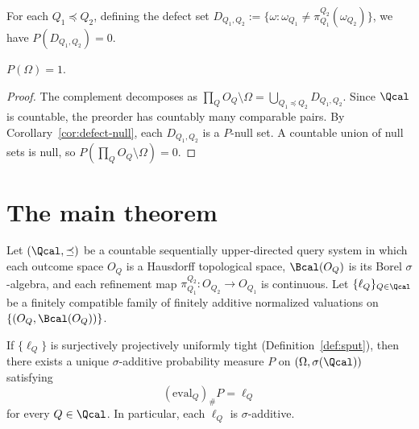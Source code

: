 \begin{corollary}
\label{cor:defect-null}
For each $Q_1 \preceq Q_2$, defining the defect set
$D_{Q_1,Q_2} := \{\omega : \omega_{Q_1} \neq
\pi^{Q_2}_{Q_1}(\omega_{Q_2})\}$, we have $P(D_{Q_1,Q_2}) = 0$.
\end{corollary}

\begin{theorem}
\label{thm:concentration}
$P(\Omega) = 1$.
\end{theorem}

\begin{proof}
The complement decomposes as
$\prod_Q O_Q \setminus \Omega = \bigcup_{Q_1 \preceq Q_2}
D_{Q_1,Q_2}$.
Since $\Qcal$ is countable, the preorder has countably many
comparable pairs.  By Corollary~\ref{cor:defect-null}, each
$D_{Q_1,Q_2}$ is a $P$-null set.  A countable union of null sets
is null, so $P(\prod_Q O_Q \setminus \Omega) = 0$.
\end{proof}

\section{The main theorem}\label{sec:main}

\begin{theorem}
\label{thm:main}
Let $(\Qcal, \preceq)$ be a countable sequentially upper-directed
query system in which each outcome space $O_Q$ is a Hausdorff
topological space, $\Bcal(O_Q)$ is its Borel $\sigma$-algebra, and
each refinement map $\pi^{Q_2}_{Q_1} : O_{Q_2} \to O_{Q_1}$ is
continuous.  Let $\{\ell_Q\}_{Q \in \Qcal}$ be a finitely compatible
family of finitely additive normalized valuations on $\{(O_Q,
\Bcal(O_Q))\}$.

If $\{\ell_Q\}$ is surjectively projectively uniformly tight
(Definition~\ref{def:sput}), then there exists a unique
$\sigma$-additive probability measure $P$ on
$(\Omega, \sigma(\Qcal))$ satisfying
\[
(\mathrm{eval}_Q)_\# P = \ell_Q
\]
for every $Q \in \Qcal$.  In particular, each $\ell_Q$ is
$\sigma$-additive.
\end{theorem}

